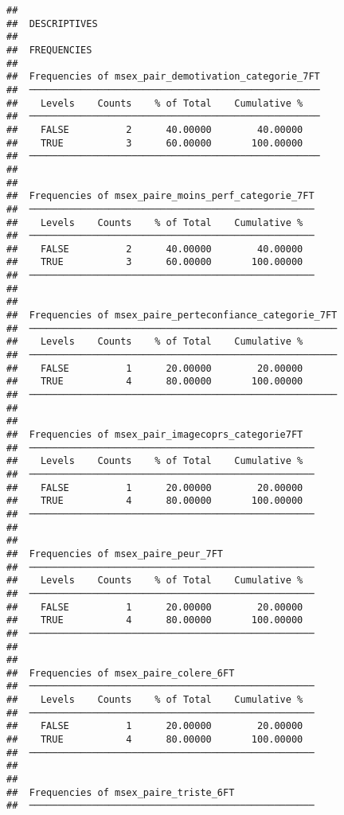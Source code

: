\documentclass[
]{article}
\begin{document}
\begin{verbatim}
## 
##  DESCRIPTIVES
## 
##  FREQUENCIES
## 
##  Frequencies of msex_pair_demotivation_categorie_7FT 
##  ─────────────────────────────────────────────────── 
##    Levels    Counts    % of Total    Cumulative %   
##  ─────────────────────────────────────────────────── 
##    FALSE          2      40.00000        40.00000   
##    TRUE           3      60.00000       100.00000   
##  ─────────────────────────────────────────────────── 
## 
## 
##  Frequencies of msex_paire_moins_perf_categorie_7FT 
##  ────────────────────────────────────────────────── 
##    Levels    Counts    % of Total    Cumulative %   
##  ────────────────────────────────────────────────── 
##    FALSE          2      40.00000        40.00000   
##    TRUE           3      60.00000       100.00000   
##  ────────────────────────────────────────────────── 
## 
## 
##  Frequencies of msex_paire_perteconfiance_categorie_7FT 
##  ────────────────────────────────────────────────────── 
##    Levels    Counts    % of Total    Cumulative %   
##  ────────────────────────────────────────────────────── 
##    FALSE          1      20.00000        20.00000   
##    TRUE           4      80.00000       100.00000   
##  ────────────────────────────────────────────────────── 
## 
## 
##  Frequencies of msex_pair_imagecoprs_categorie7FT   
##  ────────────────────────────────────────────────── 
##    Levels    Counts    % of Total    Cumulative %   
##  ────────────────────────────────────────────────── 
##    FALSE          1      20.00000        20.00000   
##    TRUE           4      80.00000       100.00000   
##  ────────────────────────────────────────────────── 
## 
## 
##  Frequencies of msex_paire_peur_7FT                 
##  ────────────────────────────────────────────────── 
##    Levels    Counts    % of Total    Cumulative %   
##  ────────────────────────────────────────────────── 
##    FALSE          1      20.00000        20.00000   
##    TRUE           4      80.00000       100.00000   
##  ────────────────────────────────────────────────── 
## 
## 
##  Frequencies of msex_paire_colere_6FT               
##  ────────────────────────────────────────────────── 
##    Levels    Counts    % of Total    Cumulative %   
##  ────────────────────────────────────────────────── 
##    FALSE          1      20.00000        20.00000   
##    TRUE           4      80.00000       100.00000   
##  ────────────────────────────────────────────────── 
## 
## 
##  Frequencies of msex_paire_triste_6FT               
##  ────────────────────────────────────────────────── 

\end{verbatim}
\end{document}
